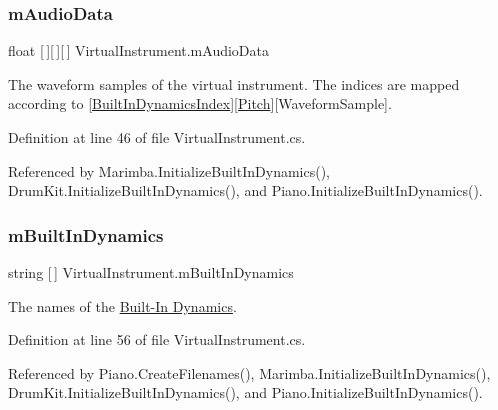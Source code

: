 \subsubsection{\texorpdfstring{m\+Audio\+Data}{mAudioData}}
{\footnotesize\ttfamily float \mbox{[}$\,$\mbox{]}\mbox{[}$\,$\mbox{]}\mbox{[}$\,$\mbox{]} Virtual\+Instrument.\+m\+Audio\+Data\hspace{0.3cm}{\ttfamily [protected]}}



The waveform samples of the virtual instrument. The indices are mapped according to \mbox{[}\hyperlink{group___audio_DefBID}{Built\+In\+Dynamics\+Index}\mbox{]}\mbox{[}\hyperlink{group___music_enums_ga508f69b199ea518f935486c990edac1d}{Pitch}\mbox{]}\mbox{[}Waveform\+Sample\mbox{]}. 



Definition at line 46 of file Virtual\+Instrument.\+cs.



Referenced by Marimba.\+Initialize\+Built\+In\+Dynamics(), Drum\+Kit.\+Initialize\+Built\+In\+Dynamics(), and Piano.\+Initialize\+Built\+In\+Dynamics().

\mbox{\label{group___v_i_base_pro_var_ga87961e72f25fbc2256b614a394aa6f13}} 
\subsubsection{\texorpdfstring{m\+Built\+In\+Dynamics}{mBuiltInDynamics}}
{\footnotesize\ttfamily string \mbox{[}$\,$\mbox{]} Virtual\+Instrument.\+m\+Built\+In\+Dynamics\hspace{0.3cm}{\ttfamily [protected]}}



The names of the \hyperlink{group___audio_DefBID}{Built-\/\+In Dynamics}. 



Definition at line 56 of file Virtual\+Instrument.\+cs.



Referenced by Piano.\+Create\+Filenames(), Marimba.\+Initialize\+Built\+In\+Dynamics(), Drum\+Kit.\+Initialize\+Built\+In\+Dynamics(), and Piano.\+Initialize\+Built\+In\+Dynamics().

\mbox{\label{group___v_i_base_pro_var_gae3db4264dc2a96e99ea680c6d637e6bf}} 
